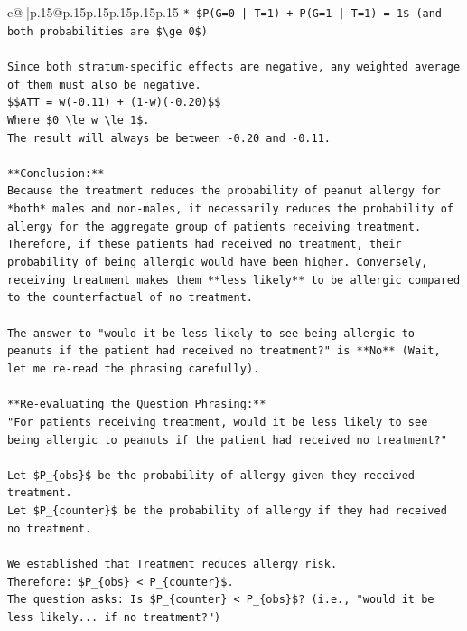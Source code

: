 \documentclass{article}
\begin{document}
{\begin{supertabular}{c@{$\;$}|p{.15\linewidth}@{}p{.15\linewidth}p{.15\linewidth}p{.15\linewidth}p{.15\linewidth}p{.15\linewidth}}
{{{\texttt{*   \$P(G=0 | T=1) + P(G=1 | T=1) = 1\$ (and both probabilities are \$\textbackslash{}ge 0\$)} \\
\\ 
\texttt{Since both stratum{-}specific effects are negative, any weighted average of them must also be negative.} \\
\texttt{\$\$ATT = w({-}0.11) + (1{-}w)({-}0.20)\$\$} \\
\texttt{Where \$0 \textbackslash{}le w \textbackslash{}le 1\$.} \\
\texttt{The result will always be between {-}0.20 and {-}0.11.} \\
\\ 
\texttt{**Conclusion:**} \\
\texttt{Because the treatment reduces the probability of peanut allergy for *both* males and non{-}males, it necessarily reduces the probability of allergy for the aggregate group of patients receiving treatment. Therefore, if these patients had received no treatment, their probability of being allergic would have been higher. Conversely, receiving treatment makes them **less likely** to be allergic compared to the counterfactual of no treatment.} \\
\\ 
\texttt{The answer to "would it be less likely to see being allergic to peanuts if the patient had received no treatment?" is **No** (Wait, let me re{-}read the phrasing carefully).} \\
\\ 
\texttt{**Re{-}evaluating the Question Phrasing:**} \\
\texttt{"For patients receiving treatment, would it be less likely to see being allergic to peanuts if the patient had received no treatment?"} \\
\\ 
\texttt{Let \$P\_\{obs\}\$ be the probability of allergy given they received treatment.} \\
\texttt{Let \$P\_\{counter\}\$ be the probability of allergy if they had received no treatment.} \\
\\ 
\texttt{We established that Treatment reduces allergy risk.} \\
\texttt{Therefore: \$P\_\{obs\} < P\_\{counter\}\$.} \\
\texttt{The question asks: Is \$P\_\{counter\} < P\_\{obs\}\$? (i.e., "would it be less likely... if no treatment?")} \\
\\ 
}}}
\end{supertabular}}
\end{document}
